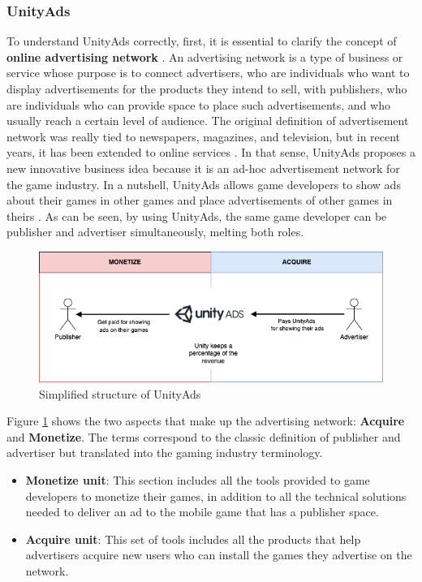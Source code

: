 \documentclass[english, 12pt, a4paper, sci, utf8, a-1b, online]{aaltothesis}
\begin{document}
\subsubsection{UnityAds}

To understand UnityAds correctly, first, it is essential to clarify the concept of \textbf{online advertising network} \cite{goldfarb2011online} \cite{schmeiser2016online}. An advertising network is a type of business or service whose purpose is to connect advertisers, who are individuals who want to display advertisements for the products they intend to sell, with publishers, who are individuals who can provide space to place such advertisements, and who usually reach a certain level of audience. The original definition of advertisement network was really tied to newspapers, magazines, and television, but in recent years, it has been extended to online services \cite{ha2008online}. In that sense, UnityAds proposes a new innovative business idea because it is an ad-hoc advertisement network for the game industry. In a nutshell, UnityAds allows game developers to show ads about their games in other games and place advertisements of other games in theirs \cite{chu2013iad}. As can be seen, by using UnityAds, the same game developer can be publisher and advertiser simultaneously, melting both roles.\\

\begin{figure}[h]
    \centering
    \includegraphics[scale=0.4]{src/thesis/img/background/unity-ads.png}
    \caption{Simplified structure of UnityAds}
    \label{fig:background:unity-ads}
\end{figure}

Figure \ref{fig:background:unity-ads} shows the two aspects that make up the advertising network: \textbf{Acquire} and \textbf{Monetize}. The terms correspond to the classic definition of publisher and advertiser but translated into the gaming industry terminology.

\begin{itemize}
    \item \textbf{Monetize unit}: This section includes all the tools provided to game developers to monetize their games, in addition to all the technical solutions needed to deliver an ad to the mobile game that has a publisher space.
    \item \textbf{Acquire unit}: This set of tools includes all the products that help advertisers acquire new users who can install the games they advertise on the network.
\end{itemize}
\end{document}
